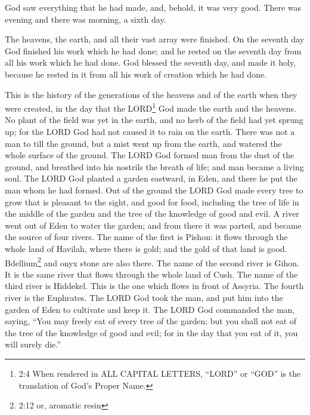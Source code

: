 \myverse{}God saw everything that he had made, and, behold, it was very good. There was evening and there was morning, a sixth day.


\mychapter{}
\myverse*{}The heavens, the earth, and all their vast array were finished.  \myverse{}On the seventh day God finished his work which he had done; and he rested on the seventh day from all his work which he had done. \myverse{}God blessed the seventh day, and made it holy, because he rested in it from all his work of creation which he had done.

\myverse{}This is the history of the generations of the heavens and of the earth when they were created, in the day that the LORD\footnote{2:4 When rendered in ALL CAPITAL LETTERS, “LORD” or “GOD” is the translation of God’s Proper Name.} God made the earth and the heavens.  \myverse{}No plant of the field was yet in the earth, and no herb of the field had yet sprung up; for the LORD God had not caused it to rain on the earth. There was not a man to till the ground, \myverse{}but a mist went up from the earth, and watered the whole surface of the ground. \myverse{}The LORD God formed man from the dust of the ground, and breathed into his nostrils the breath of life; and man became a living soul. \myverse{}The LORD God planted a garden eastward, in Eden, and there he put the man whom he had formed. \myverse{}Out of the ground the LORD God made every tree to grow that is pleasant to the sight, and good for food, including the tree of life in the middle of the garden and the tree of the knowledge of good and evil. \myverse{}A river went out of Eden to water the garden; and from there it was parted, and became the source of four rivers. \myverse{}The name of the first is Pishon: it flows through the whole land of Havilah, where there is gold; \myverse{}and the gold of that land is good. Bdellium\footnote{2:12 or, aromatic resin} and onyx stone are also there. \myverse{}The name of the second river is Gihon. It is the same river that flows through the whole land of Cush. \myverse{}The name of the third river is Hiddekel. This is the one which flows in front of Assyria. The fourth river is the Euphrates. \myverse{}The LORD God took the man, and put him into the garden of Eden to cultivate and keep it. \myverse{}The LORD God commanded the man, saying, “You may freely eat of every tree of the garden; \myverse{}but you shall not eat of the tree of the knowledge of good and evil; for in the day that you eat of it, you will surely die.”

